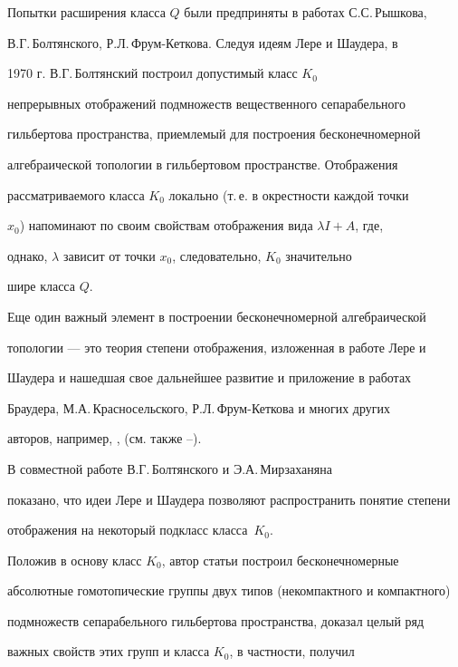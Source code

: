 Попытки расширения класса $Q$ были предприняты в работах С.С.\,Рышкова, 


В.Г.\,Болтянского, Р.Л.\,Фрум-Кеткова. Следуя идеям Лере и Шаудера, в 


1970 г. В.Г.\,Болтянский построил \cite{1} допустимый класс $K_0$ 


непрерывных отображений подмножеств вещественного сепарабельного 


гильбертова пространства, приемлемый для построения бесконечномерной 


алгебраической топологии в гильбертовом пространстве. Отображения 


рассматриваемого класса $K_0$ локально (т.\,е. в окрестности каждой точки 


$x_0$) напоминают по своим свойствам отображения вида $\lambda I+A$, где, 


однако, $\lambda$ зависит от точки $x_0$, следовательно, $K_0$ значительно 


шире класса $Q$. 


 


Еще один важный элемент в построении бесконечномерной алгебраической 


топологии --- это теория степени отображения, изложенная в работе Лере и 


Шаудера и нашедшая свое дальнейшее развитие и приложение в работах 


Браудера, М.А.\,Красносельского, Р.Л.\,Фрум-Кеткова и многих других 


авторов, например, \cite{2}, \cite{3} (см. также \cite{4}--\cite{15}). 


 


В совместной работе В.Г.\,Болтянского и Э.А.\,Мирзаханяна \cite{4} 


показано, что идеи Лере и Шаудера позволяют распространить понятие степени 


отображения на некоторый подкласс класса~$K_0$. 


 


Положив в основу класс $K_0$, автор статьи построил бесконечномерные 


абсолютные гомотопические группы двух типов (некомпактного и компактного) 


подмножеств сепарабельного гильбертова пространства, доказал целый ряд 


важных свойств этих групп и класса $K_0$, в частности, получил 


